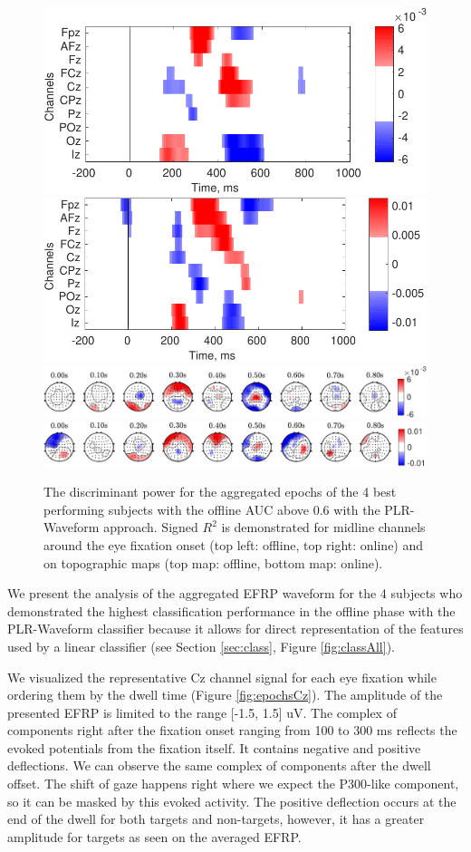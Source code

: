 \documentclass[12pt]{iopart}
\begin{document}
\begin{figure}[!t]
\center
    \includegraphics[trim={0cm 0.01cm 0cm 0cm},clip,width=0.45\columnwidth]{../images/SignR_offline.pdf}
    \includegraphics[trim={0cm 0cm 0cm 0.01cm},clip,width=0.45\columnwidth]{../images/SignR_online.pdf}
    \includegraphics[trim={0cm 0cm 0cm 0cm},clip,width=0.9\columnwidth]{../images/offline/TopoPlot_TLock-start_signRSquare_Saggregate_objrec_subjects_popuponline_s1.pdf}
    \includegraphics[trim={0cm 0cm 0cm 0cm},clip,width=0.9\columnwidth]{../images/online/TopoPlot_TLock-start_signRSquare_Saggregate_objrec_subjects_popuponline_s1.pdf}
    \caption{The discriminant power for the aggregated epochs of
        the 4 best performing subjects with the offline AUC above 0.6 with the PLR-Waveform approach.
    Signed $R^2$ is demonstrated for midline channels around the eye fixation onset
    (top left: offline, top right: online) and on topographic maps (top map: offline, bottom map: online).}
\label{fig:signR}
\end{figure}


We present the analysis of the aggregated EFRP waveform
for the 4 subjects who demonstrated
the highest classification performance in the offline phase with the 
PLR-Waveform classifier because it allows for direct representation
of the features used by a linear classifier (see Section \ref{sec:class}, Figure \ref{fig:classAll}).

We visualized the representative Cz channel signal
for each eye fixation while ordering them
by the dwell time (Figure \ref{fig:epochsCz}).
The amplitude of the presented EFRP is limited to the range [-1.5, 1.5] uV.
The complex of components right after the fixation onset ranging from 100 to 300 ms
reflects the evoked potentials from the fixation itself. It contains
negative and positive deflections. We can observe the same complex of components
after the dwell offset. The shift of gaze happens right where we expect 
the P300-like component, so it can be masked by this evoked activity.
The positive deflection occurs at the end of the dwell for both
targets and non-targets, however, it has a greater amplitude for targets
as seen on the averaged EFRP.
\end{document}
